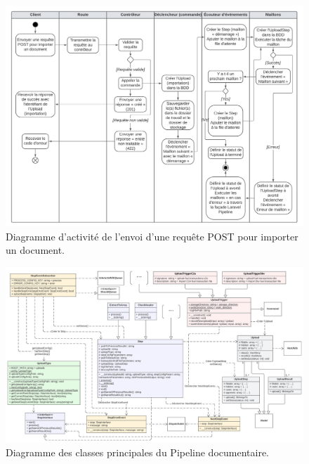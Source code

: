 \begin{figure}
    \centering
    \includegraphics[width=\textwidth]{img/import-activity-diagram}
    \caption{Diagramme d'activité de l'envoi d'une requête POST pour importer un document.}
    \label{fig:import-activity-diagram}
\end{figure}

\begin{figure}
    \centering
    \includegraphics[width=\textwidth]{img/class-diagram-2}
    \caption{Diagramme des classes principales du Pipeline documentaire.}
    \label{fig:class-diagram}
\end{figure}